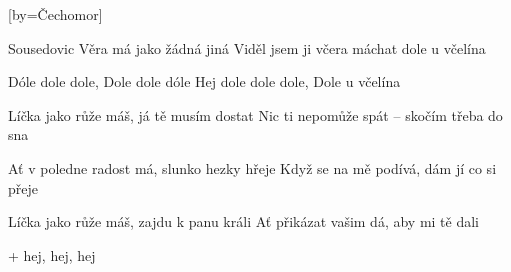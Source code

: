 [by={Čechomor}]

\beginverse{}
\lrep{} Sousedovic Věra má jako žádná jiná
Viděl jsem ji včera máchat dole u včelína \rrep{}
\endverse{}

\beginchorus{}
\lrep{} Dóle dole dole, Dole dole dóle
Hej dole dole dole, Dole u včelína \rrep{}
\endchorus{}

\beginverse{}
\lrep{} Líčka jako růže máš, já tě musím dostat
Nic ti nepomůže spát -- skočím třeba do sna \rrep{}
\endverse{}

\beginchorus{}
\phantom{}
\endchorus{}

\beginverse{}
\lrep{} Ať v poledne radost má, slunko hezky hřeje
Když se na mě podívá, dám jí co si přeje \rrep{}
\endverse{}

\beginchorus{}
\phantom{}
\endchorus{}

\beginverse{}
\lrep{} Líčka jako růže máš, zajdu k panu králi
Ať přikázat vašim dá, aby mi tě dali \rrep{}
\endverse{}

\beginchorus{}


+ hej, hej, hej
\endchorus{}

\endsong{}
